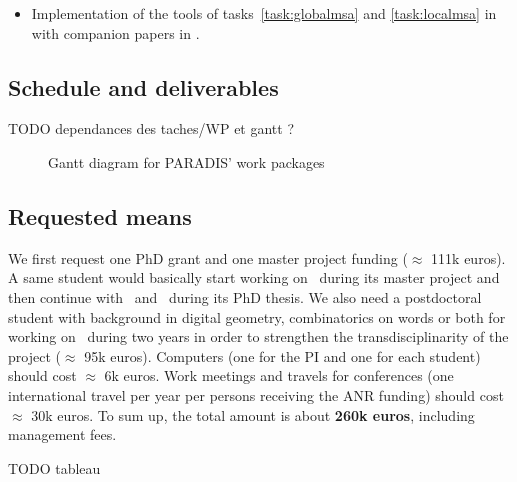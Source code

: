\Success
\begin{itemize}
  \item Implementation of the tools of tasks~\ref{task:globalmsa} and \ref{task:localmsa}
    in \DGtalTools~ with companion papers in \IPOL.
\end{itemize}


\subsection{Schedule and deliverables}
\label{sec:schedule}

TODO dependances des taches/WP et gantt ?

\begin{figure}[htbp]
  \centering
  
  \caption{Gantt diagram for PARADIS' work packages}
  \label{fig:gantt}
\end{figure}

\subsection{Requested means}
\label{sec:ressources}




We first request one PhD grant and one master project funding ($\approx$ 111k euros). A same student would basically start working on \wpPPA~during its master project and then continue with \wpEstim~and \wpScale~during its PhD thesis. We also need a postdoctoral student with background in digital geometry, combinatorics on words or both for working on \wpPattern~during two years in order to strengthen the transdisciplinarity of the project ($\approx$ 95k euros). 
Computers (one for the PI and one for each student) should cost $\approx$ 6k euros. Work meetings and travels for conferences (one international travel per year per persons receiving the ANR funding) should cost $\approx$ 30k euros. 
To sum up, the total amount is about \textbf{260k euros}, including management fees. 

TODO tableau


